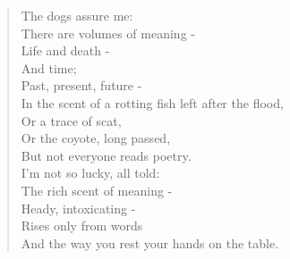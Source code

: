 \documentclass[12pt,letterpaper,oneside]{memoir}
\begin{document}
  \pagestyle{empty}
  \begin{verse}
    The dogs assure me:\\
    There are volumes of meaning -\\
    Life and death -\\
    And time;\\
    Past, present, future -\\
    In the scent of a rotting fish left after the flood,\\
    Or a trace of scat,\\
    Or the coyote, long passed,\\
    But not everyone reads poetry.\\

    \vspace{1pc}
    I'm not so lucky, all told:\\
    The rich scent of meaning -\\
    Heady, intoxicating -\\
    Rises only from words\\
    And the way you rest your hands on the table.
  \end{verse}
\end{document}
